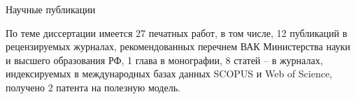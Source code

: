 

     Научные публикации


      По теме диссертации имеется 27 печатных работ, в том числе, 12
публикаций в рецензируемых журналах, рекомендованных перечнем ВАК
Министерства науки и высшего образования РФ, 1 глава в монографии, 8 статей –
в журналах, индексируемых в международных базах данных SCOPUS и Web of
Science, получено 2 патента на полезную модель.


